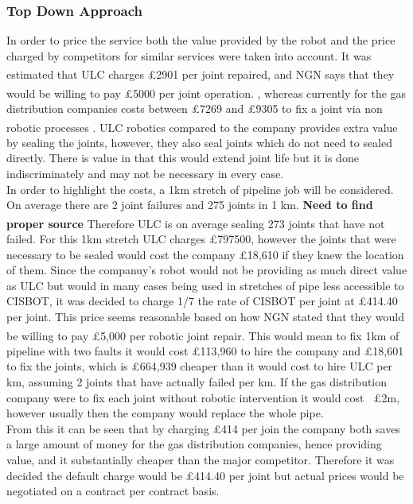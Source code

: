 \documentclass[11pt]{article}		%
\newcommand{\supercite}[1]{\textsuperscript{\cite{#1}}}		%
\begin{document}
        	\subsubsection{Top Down Approach}
	            In order to price the service both the value provided by the robot and the price charged by competitors for similar services were taken into account. It was estimated that ULC charges £2901 per joint repaired,\supercite{NYT} and NGN says that they would be willing to pay £5000 per joint operation. \supercite{NGN}, whereas currently for the gas distribution companies costs between £7269 and £9305 to fix a joint via non robotic processes \supercite{NYT}. 
	            ULC robotics compared to the company provides extra value by sealing the joints, however, they also seal joints which do not need to sealed directly. There is value in that this would extend joint life but it is done indiscriminately and may not be necessary in every case.
	            \\
	            In order to highlight the costs, a 1km stretch of pipeline job will be considered. On average there are 2 joint failures and 275 joints in 1 km. \textbf{Need to find proper source} \supercite{SGN_Southern} Therefore ULC is on average sealing 273 joints that have not failed. For this 1km stretch ULC  charges £797500, however the joints that were necessary to be sealed would cost the company £18,610 if they knew the location of them. Since the companuy's robot would  not be providing as much direct value as ULC but would in many cases being used in stretches of pipe less accessible to CISBOT, it was decided to charge 1/7 the rate of CISBOT per joint at £414.40 per joint. This price seems reasonable based on how NGN stated that they would be willing to pay £5,000 per robotic joint repair.\supercite{NGN} This would mean to fix 1km of pipeline with two faults it would cost £113,960 to hire the company and £18,601 to fix the joints, which is £664,939 cheaper than it would cost to hire ULC per km, assuming 2 joints that have actually failed per km. If the gas distribution company were to fix each joint without robotic intervention it would cost ~£2m, however usually then the company would replace the whole pipe.
	            \\
	            From this it can be seen that by charging £414 per join the company both saves a large amount of money for the gas distribution companies, hence providing value, and it substantially cheaper than the major competitor. Therefore it was decided the default charge would be £414.40 per joint but actual prices would be negotiated on a contract per contract basis.
\end{document}
